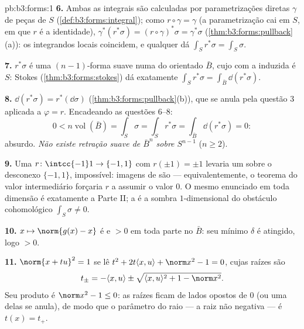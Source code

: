 \begin{solution}{pb:b3:forms:1}
\textbf{6.} Ambas as integrais são calculadas por parametrizações
diretas $\gamma$ de peças de $S$
(\cref{def:b3:forms:integral}); como $r\circ\gamma =
\gamma$ (a parametrização cai em $S$, em que $r$ é a
identidade), $\gamma^*(r^*\sigma) = (r\circ\gamma)^*\sigma =
\gamma^*\sigma$ (\cref{thm:b3:forms:pullback}(a)): os
integrandos locais coincidem, e qualquer  dá
$\int_Sr^*\sigma = \int_S\sigma$.

\textbf{7.} $r^*\sigma$ é uma $(n-1)$-forma suave numa
 do  orientado $\bar B$, cujo
 com a  induzida é $S$: Stokes
(\cref{thm:b3:forms:stokes}) dá exatamente
$\int_Sr^*\sigma = \int_{\bar B}\dd(r^*\sigma)$.

\textbf{8.} $\dd(r^*\sigma) = r^*(\dd\sigma)$
(\cref{thm:b3:forms:pullback}(b)), que se anula pela
questão 3 aplicada a $\varphi = r$. Encadeando as questões
6--8:
\[
0 < n\operatorname{vol}(\bar B) = \int_S\sigma =
\int_Sr^*\sigma = \int_{\bar B}\dd(r^*\sigma) = 0 :
\]
absurdo. \emph{Não existe retração suave de $\bar B^n$
sobre $S^{n-1}$} ($n \geq 2$).

\textbf{9.} Uma $r\colon\intcc{-1}1\to\{-1,1\}$ 
com $r(\pm1) = \pm1$ levaria um  sobre o
desconexo $\{-1, 1\}$, impossível: imagens  de
 são  --- equivalentemente, o
teorema do valor intermediário forçaria $r$ a assumir o valor
$0$. O mesmo enunciado em toda dimensão é exatamente a Parte
II; a  é a sombra $1$-dimensional do
obstáculo cohomológico $\int_S\sigma \neq 0$.

\textbf{10.} $x \mapsto \norm{g(x) - x}$ é  e
$> 0$ em toda parte no  $\bar B$: seu mínimo
$\delta$ é atingido, logo $> 0$.

\textbf{11.} $\norm{x + tu}^2 = 1$ se lê $t^2 + 2t\langle x,
u\rangle + \norm x^2 - 1 = 0$, cujas raízes são
\[
t_\pm = -\langle x, u\rangle \pm \sqrt{\langle x,
u\rangle^2 + 1 - \norm x^2} .
\]
Seu produto é $\norm x^2 - 1 \leq 0$: as raízes ficam de lados opostos de
$0$ (ou uma delas se anula), de modo que o parâmetro do raio --- a
raiz não negativa --- é $t(x) = t_+$.


\end{solution}

